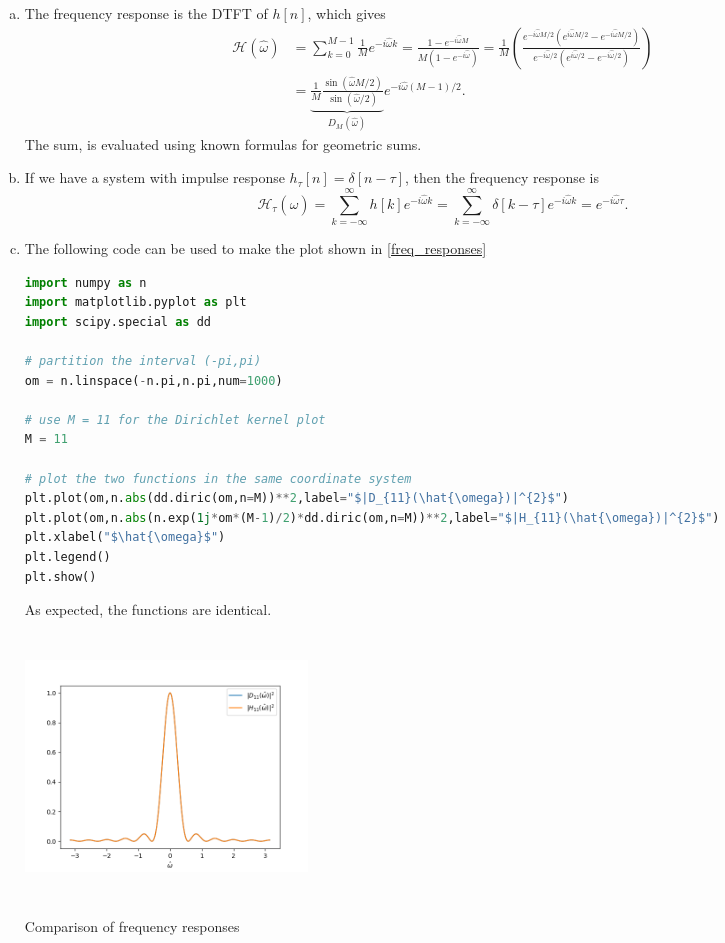 \begin{enumerate}
\begin{enumerate}[a)]
\item The frequency response is the DTFT of $h[n]$, which gives
\begin{align*}
    \mathcal{H}(\hat{\omega})&=\sum_{k=0}^{M-1}\frac{1}{M}e^{-i\hat{\omega}k}=\frac{1-e^{-i\hat{\omega}M}}{M(1-e^{-i\hat{\omega}})}=\frac{1}{M}\left(\frac{e^{-i\hat{\omega}M/2}(e^{i\hat{\omega}M/2}-e^{-i\hat{\omega}M/2})}{e^{-i\hat{\omega}/2}(e^{i\hat{\omega}/2}-e^{-i\hat{\omega}/2})}\right) \\
    &=\underbrace{\frac{1}{M}\frac{\sin(\hat{\omega}M/2)}{\sin(\hat{\omega}/2)}}_{D_{M}(\hat{\omega})}e^{-i\hat{\omega}(M-1)/2}.
\end{align*}
The sum, is evaluated using known formulas for geometric sums. 

\item If we have a system with impulse response $h_{\tau}[n]=\delta[n-\tau]$, then the frequency response is
$$\mathcal{H}_{\tau}(\hat{\omega})=\sum_{k=-\infty}^{\infty}h[k]e^{-i\hat{\omega}k}=\sum_{k=-\infty}^{\infty}\delta[k-\tau]e^{-i\hat{\omega}k}=e^{-i\hat{\omega}\tau}.$$

\item The following code can be used to make the plot shown in \ref{freq_responses}
\begin{lstlisting}[language=Python, caption=Plotting the frequency response code,label=code14_2]
import numpy as n
import matplotlib.pyplot as plt
import scipy.special as dd

# partition the interval (-pi,pi)
om = n.linspace(-n.pi,n.pi,num=1000)

# use M = 11 for the Dirichlet kernel plot
M = 11

# plot the two functions in the same coordinate system
plt.plot(om,n.abs(dd.diric(om,n=M))**2,label="$|D_{11}(\hat{\omega})|^{2}$")
plt.plot(om,n.abs(n.exp(1j*om*(M-1)/2)*dd.diric(om,n=M))**2,label="$|H_{11}(\hat{\omega})|^{2}$")
plt.xlabel("$\hat{\omega}$")
plt.legend()
plt.show()
\end{lstlisting}
As expected, the functions are identical. 
\begin{marginfigure}
    \includegraphics[height=7.0cm,width=7.5cm]{ch11/figures/frequency_responses.png}
    \caption{Comparison of frequency responses}
    \label{freq_responses}
\end{marginfigure}


\end{enumerate}
\end{enumerate}

